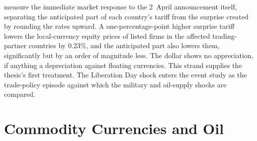 \textcite{benguria_saffie_2025} measure the immediate market response to the 2~April announcement itself, separating the anticipated part of each country's tariff from the surprise created by rounding the rates upward. A one-percentage-point higher surprise tariff lowers the local-currency equity prices of listed firms in the affected trading-partner countries by 0.23\%, and the anticipated part also lowers them, significantly but by an order of magnitude less. The dollar shows no appreciation, if anything a depreciation against floating currencies. This strand supplies the thesis's first treatment. The
Liberation Day shock enters the event study as the trade-policy episode against
which the military and oil-supply shocks are compared.

\section{Commodity Currencies and Oil}
\label{sec:lit_commodities}


